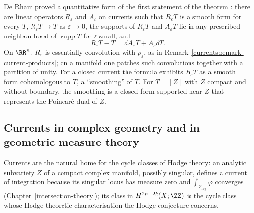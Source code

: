 \begin{remark}\label{currents:remark-regularisation}
De Rham proved a quantitative form of the first statement of the theorem \cite{de-rham-book}: there are linear operators $R_\varepsilon$ and $A_\varepsilon$ on currents such that $R_\varepsilon T$ is a
smooth form for every $T$, $R_\varepsilon T \to T$ as $\varepsilon \to 0$, the supports of $R_\varepsilon T$ and $A_\varepsilon T$ lie in any prescribed neighbourhood of $\operatorname{supp}T$ for $\varepsilon$
small, and
\[
R_\varepsilon T - T = dA_\varepsilon T + A_\varepsilon dT .
\]
On $\RR^n$, $R_\varepsilon$ is essentially convolution with $\rho_\varepsilon$, as in Remark~\ref{currents:remark-current-products}; on a manifold one patches such convolutions together with a partition of unity. For a closed
current the formula exhibits $R_\varepsilon T$ as a smooth form cohomologous to $T$, a ``smoothing'' of $T$. For $T = [Z]$ with $Z$ compact and without boundary, the smoothing is a closed form supported near $Z$ that
represents the Poincar\'e dual of $Z$.
\end{remark}

\subsection{Currents in complex geometry and in geometric measure theory}\label{currents:subsection-currents-further}

\begin{remark}\label{currents:remark-cycle-classes}
Currents are the natural home for the cycle classes of Hodge theory: an analytic subvariety $Z$ of a compact complex manifold, possibly singular, defines a current of integration because its singular locus
has measure zero and $\int_{Z_{\mathrm{reg}}}\varphi$ converges (Chapter~\ref{intersection-theory}); its class in $H^{2n-2k}(X; \ZZ)$ is the cycle class whose Hodge-theoretic characterisation the Hodge conjecture
concerns.
\end{remark}


